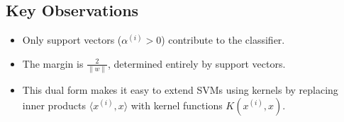 \documentclass[11pt]{article}
\begin{document}
\subsection*{Key Observations}
\begin{itemize}
    \item Only support vectors ($\alpha^{(i)} > 0$) contribute to the classifier.
    \item The margin is $\tfrac{2}{\|w\|}$, determined entirely by support vectors.
    \item This dual form makes it easy to extend SVMs using kernels by replacing inner products $\langle x^{(i)}, x \rangle$ with kernel functions $K(x^{(i)}, x)$.
\end{itemize}
\end{document}
